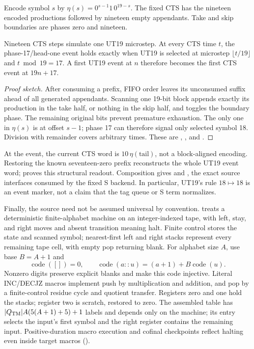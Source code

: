 Encode symbol $s$ by $\eta(s)=0^{s-1}1\,0^{19-s}$.
The fixed CTS has the nineteen encoded productions followed by nineteen empty
appendants.  Take and skip boundaries are phases zero and nineteen.

\begin{lemma}
Nineteen CTS steps simulate one UT19 microstep.  At every CTS time $t$, the
phase-17/head-one event holds exactly when UT19 is selected at microstep
$\lfloor t/19\rfloor$ and $t\bmod19=17$.  A first UT19 event at $n$ therefore
becomes the first CTS event at $19n+17$.
\end{lemma}

\begin{proof}[Proof sketch]
After consuming a prefix, FIFO order leaves its unconsumed suffix ahead of
all generated appendants.  Scanning one 19-bit block appends exactly its
production in the take half, or nothing in the skip half, and toggles the
boundary phase.  The remaining original bits prevent premature exhaustion.
The only one in $\eta(s)$ is at offset $s-1$; phase 17 can therefore signal only
selected symbol 18.  Division with remainder covers arbitrary times.
These are ,
, and .
\end{proof}

At the event, the current CTS word is $10\,\eta(\text{tail})$, not a block-aligned
encoding.  Restoring the known seventeen-zero prefix reconstructs the whole
UT19 event word;  proves this
structural readout.  Composition gives
 and
, the exact source interfaces consumed by the
fixed S backend.  In particular, UT19's rule $18\mapsto18$ is an event marker,
not a claim that the tag queue or S term normalizes.

Finally, the source need not be assumed universal by convention.
 treats a deterministic finite-alphabet machine on an
integer-indexed tape, with left, stay, and right moves and absent transition
meaning halt.  Finite control stores the state and scanned symbol; nearest-first
left and right stacks represent every remaining tape cell, with empty pop
returning blank.  For alphabet size $A$, use base $B=A+1$ and
\[
 \operatorname{code}([])=0,\qquad
 \operatorname{code}(a::u)=(a+1)+B\operatorname{code}(u).
\]
Nonzero digits preserve explicit blanks and make this code injective.
Literal INC/DECJZ macros implement push by multiplication and addition, and
pop by a finite-control residue cycle and quotient transfer.  Registers zero
and one hold the stacks; register two is scratch, restored to zero.
The assembled table has
$|Q_{\rm TM}|A(5(A+1)+5)+1$ labels and depends only on the machine; its entry
selects the input's first symbol and the right register contains the remaining
input.  Positive-duration macro execution and cofinal checkpoints reflect
halting even inside target macros
().

